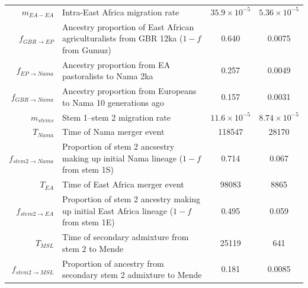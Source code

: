 \documentclass[]{article}
\begin{document}
\begin{table}[ht]
\begin{tabular}[t]{rP{8cm}cc}
    $m_{EA-EA}$ & Intra-East Africa migration rate & $35.9\times10^{-5}$ & $5.36\times10^{-5}$ \\
    $f_{GBR \rightarrow EP}$ & Ancestry proportion of East African agriculturalists from GBR 12ka ($1-f$ from Gumuz) & 0.640 & 0.0075 \\
    $f_{EP \rightarrow Nama}$ & Ancestry proportion from EA pastoralists to Nama 2ka & 0.257 & 0.0049 \\
    $f_{GBR \rightarrow Nama}$ & Ancestry proportion from Europeans to Nama 10 generations ago & 0.157 & 0.0031 \\
    $m_{stems}$ & Stem 1--stem 2 migration rate & $11.6\times10^{-5}$ & $8.74\times10^{-5}$ \\
    $T_{Nama}$ & Time of Nama merger event & 118547 & 28170 \\
    $f_{stem 2 \rightarrow Nama}$ & Proportion of stem 2 ancsestry making up initial Nama lineage ($1-f$ from stem 1S) & 0.714 & 0.067 \\
    $T_{EA}$ & Time of East Africa merger event & 98083 & 8865 \\
    $f_{stem 2 \rightarrow EA}$ & Proportion of stem 2 ancestry making up initial East Africa lineage ($1-f$ from stem 1E) & 0.495 & 0.059 \\
    $T_{MSL}$ & Time of secondary admixture from stem 2 to Mende & 25119 & 641 \\
    $f_{stem 2 \rightarrow MSL}$ & Proportion of ancestry from secondary stem 2 admixture to Mende & 0.181 & 0.0085 \\
    \bottomrule
\end{tabular}
\end{table}

\newcommand{\specialcell}[2][c]{%
  \begin{tabular}[#1]{@{}c@{}}#2\end{tabular}}
\end{document}
